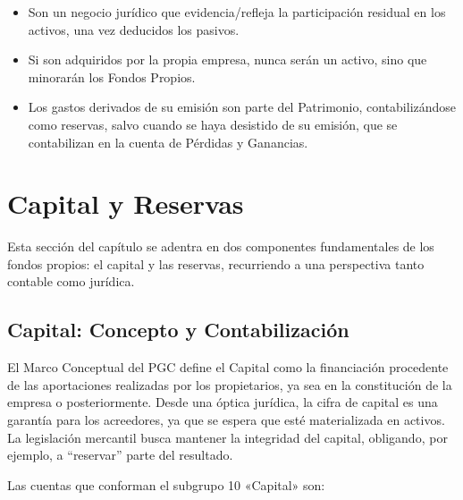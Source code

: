 \documentclass[
  paper=a4,
  ,captions=tableheading
]{scrbook}
\providecommand{\tightlist}{%
  \setlength{\itemsep}{0pt}\setlength{\parskip}{0pt}}
\begin{document}
\begin{itemize}
  \begin{itemize}
  \tightlist
  \item
    Son un negocio jurídico que evidencia/refleja la participación
    residual en los activos, una vez deducidos los pasivos.
  \item
    Si son adquiridos por la propia empresa, nunca serán un activo, sino
    que minorarán los Fondos Propios.
  \item
    Los gastos derivados de su emisión son parte del Patrimonio,
    contabilizándose como reservas, salvo cuando se haya desistido de su
    emisión, que se contabilizan en la cuenta de Pérdidas y Ganancias.
  \end{itemize}
\end{itemize}

\hypertarget{capital-y-reservas}{%
\section{Capital y Reservas}\label{capital-y-reservas}}

Esta sección del capítulo se adentra en dos componentes fundamentales de
los fondos propios: el capital y las reservas, recurriendo a una
perspectiva tanto contable como jurídica.

\hypertarget{capital-concepto-y-contabilizaciuxf3n}{%
\subsection{Capital: Concepto y
Contabilización}\label{capital-concepto-y-contabilizaciuxf3n}}

El Marco Conceptual del PGC define el Capital como la financiación
procedente de las aportaciones realizadas por los propietarios, ya sea
en la constitución de la empresa o posteriormente. Desde una óptica
jurídica, la cifra de capital es una garantía para los acreedores, ya
que se espera que esté materializada en activos. La legislación
mercantil busca mantener la integridad del capital, obligando, por
ejemplo, a ``reservar'' parte del resultado.

Las cuentas que conforman el subgrupo 10 «Capital» son:
\end{document}
